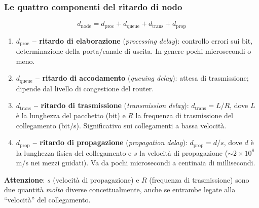 \documentclass[12pt, a4paper]{article}
\begin{document}
\subsubsection{Le quattro componenti del ritardo di nodo}

\begin{tcolorbox}[colback=lightergray!10, colframe=tocsec, title=\textbf{Formula del ritardo di nodo}]
$$d_{\text{node}} = d_{\text{proc}} + d_{\text{queue}} + d_{\text{trans}} + d_{\text{prop}}$$
\end{tcolorbox}

\begin{enumerate}
    \item \textcolor{blue!70!black}{\textbf{$d_{\text{proc}}$ -- ritardo di elaborazione}} (\textit{processing delay}): controllo errori sui bit, determinazione della porta/canale di uscita. In genere pochi microsecondi o meno.
    \item \textcolor{blue!70!black}{\textbf{$d_{\text{queue}}$ -- ritardo di accodamento}} (\textit{queuing delay}): attesa di trasmissione; dipende dal livello di congestione del router.
    \item \textcolor{blue!70!black}{\textbf{$d_{\text{trans}}$ -- ritardo di trasmissione}} (\textit{transmission delay}): $d_{\text{trans}} = L/R$, dove $L$ è la lunghezza del pacchetto (bit) e $R$ la frequenza di trasmissione del collegamento (bit/s). Significativo sui collegamenti a bassa velocità.
    \item \textcolor{blue!70!black}{\textbf{$d_{\text{prop}}$ -- ritardo di propagazione}} (\textit{propagation delay}): $d_{\text{prop}} = d/s$, dove $d$ è la lunghezza fisica del collegamento e $s$ la velocità di propagazione ($\sim 2\times10^8$ m/s nei mezzi guidati). Va da pochi microsecondi a centinaia di millisecondi.
\end{enumerate}

\textbf{Attenzione}: $s$ (velocità di propagazione) e $R$ (frequenza di trasmissione) sono due quantità \textit{molto} diverse concettualmente, anche se entrambe legate alla ``velocità'' del collegamento.
\end{document}
